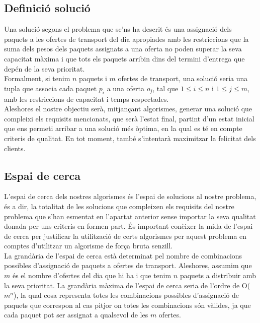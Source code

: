 \documentclass[a4paper]{article}
\begin{document}
	\subsection{Definició solució}

	Una solució segons el problema que se'ns ha descrit és una assignació dels paquets a les ofertes de transport del dia apropiades amb les restriccions que la suma dels pesos dels paquets assignats a una oferta no poden superar la seva capacitat màxima i que tots els paquets arribin dins del termini d'entrega que depén de la seva prioritat. \\

	Formalment, si tenim $n$ paquets i $m$ ofertes de transport, una solució seria una tupla que associa cada paquet $p_i$ a una oferta $o_j$, tal que \( 1 \leq i \leq n \) i \( 1 \leq j \leq m \), amb les restriccions de capacitat i temps respectades. \\

	Aleshores el nostre objectiu serà, mitjançant algorismes, generar una solució que compleixi els requisits mencionats, que serà l'estat final, partint d'un estat inicial que ens permeti arribar a una solució més òptima, en la qual es té en compte criteris de qualitat. En tot moment, també s'intentarà maximitzar la felicitat dels clients. \\

	\subsection{Espai de cerca}

	L'espai de cerca dels nostres algorismes és l'espai de solucions al nostre problema, és a dir, la totalitat de les solucions que compleixen els requisits del nostre problema que s'han esmentat en l'apartat anterior sense importar la seva qualitat donada per uns criteris en formen part. És important conèixer la mida de l'espai de cerca per justificar la utilització de certs algorismes per aquest problema en comptes d'utilitzar un algorisme de força bruta senzill. \\

	La grandària de l'espai de cerca està determinat pel nombre de combinacions possibles d'assignació de paquets a ofertes de transport. Aleshores, assumim que $m$ és el nombre d'ofertes del dia que hi ha i que tenim $n$ paquets a distribuir amb la seva prioritat. La grandària màxima de l'espai de cerca seria de l'ordre de O($m^n$), la qual cosa representa totes les combinacions possibles d'assignació de paquets que correspon al cas pitjor on totes les combinacions són vàlides, ja que cada paquet pot ser assignat a qualsevol de les $m$ ofertes. \\
\end{document}
